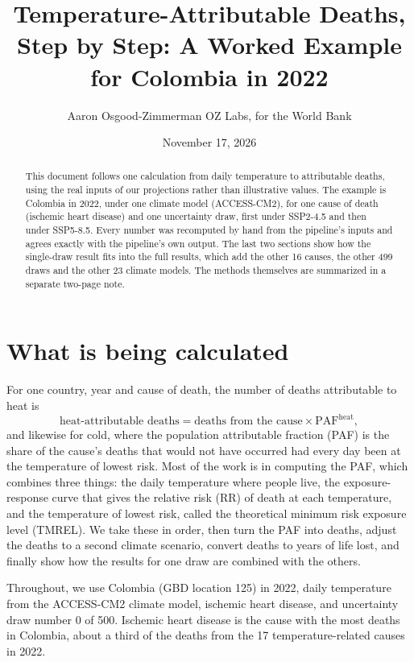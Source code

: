 \documentclass[11pt]{ozreport}
\title{Temperature-Attributable Deaths, Step by Step: A Worked Example for Colombia in 2022}
\author{Aaron Osgood-Zimmerman \quad\textperiodcentered\quad OZ Labs, for the World Bank}
\date{November 17, 2026}
\begin{document}
\maketitle

\begin{abstract}
This document follows one calculation from daily temperature to attributable deaths, using the real inputs of our projections rather than illustrative values. The example is Colombia in 2022, under one climate model (ACCESS-CM2), for one cause of death (ischemic heart disease) and one uncertainty draw, first under SSP2-4.5 and then under SSP5-8.5. Every number was recomputed by hand from the pipeline's inputs and agrees exactly with the pipeline's own output. The last two sections show how the single-draw result fits into the full results, which add the other 16 causes, the other 499 draws and the other 23 climate models. The methods themselves are summarized in a separate two-page note.
\end{abstract}

\section{What is being calculated}

For one country, year and cause of death, the number of deaths attributable to heat is
\begin{equation}
  \text{heat-attributable deaths} = \text{deaths from the cause} \times \mathrm{PAF}^{\text{heat}},
\end{equation}
and likewise for cold, where the population attributable fraction (PAF) is the share of the cause's deaths that would not have occurred had every day been at the temperature of lowest risk. Most of the work is in computing the PAF, which combines three things: the daily temperature where people live, the exposure-response curve that gives the relative risk (RR) of death at each temperature, and the temperature of lowest risk, called the theoretical minimum risk exposure level (TMREL). We take these in order, then turn the PAF into deaths, adjust the deaths to a second climate scenario, convert deaths to years of life lost, and finally show how the results for one draw are combined with the others.

Throughout, we use Colombia (GBD location 125) in 2022, daily temperature from the ACCESS-CM2 climate model, ischemic heart disease, and uncertainty draw number 0 of 500. Ischemic heart disease is the cause with the most deaths in Colombia, about a third of the deaths from the 17 temperature-related causes in 2022.
\end{document}
